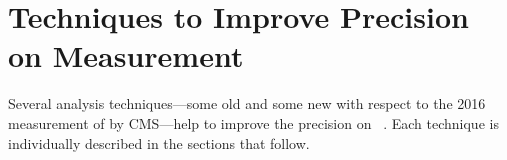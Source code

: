 \section{Techniques to Improve Precision on \mH Measurement}
\label{sec:techniques}

Several analysis techniques---some old and some new with respect to the 2016 measurement of \mH by CMS---help to improve the precision on \mH~\cite{HIG_16_041}.
Each technique is individually described in the sections that follow.





% 
